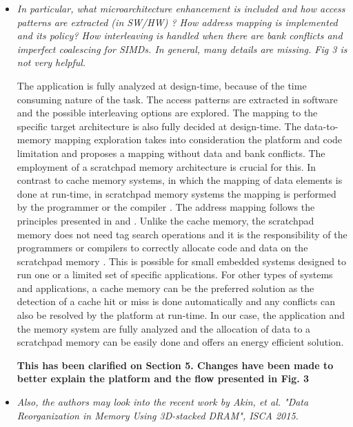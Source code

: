 \documentclass[12pt,a4paper,notitlepage]{article}
\begin{document}
\begin{itemize}

\item \textit{In particular, what microarchitecture enhancement is included and how access patterns are extracted (in SW/HW) ?  How address mapping is implemented and its policy?  How interleaving is handled when there are bank conflicts and imperfect coalescing for SIMDs.  In general,  many details are missing.  Fig 3 is not very helpful.}

The application is fully analyzed at design-time, because of the time consuming nature of the task. 
The access patterns are extracted in software and the possible interleaving options are explored. 
The mapping to the specific target architecture is also fully decided at design-time.
The data-to-memory mapping exploration takes into consideration the platform and code limitation and proposes a mapping without data and bank conflicts.
The employment of a scratchpad memory architecture is crucial for this.
In contrast to cache memory systems, in which the mapping of data elements is done at run-time, in scratchpad memory systems the mapping is performed by the programmer or the compiler \cite{ishitobi2007code}. 
The address mapping follows the principles presented in \cite{address} and \cite{sharma2015array}. 
Unlike the cache memory, the scratchpad memory does not need tag search operations and it is the responsibility of the programmers or compilers to correctly allocate code and data on the scratchpad memory \cite{steinke2002assigning}.
This is possible for small embedded systems designed to run one or a limited set of specific applications. 
For other types of systems and applications, a cache memory can be the preferred solution as the detection of a cache hit or miss is done automatically and any conflicts can also be resolved by the platform at run-time.
In our case, the application and the memory system are fully analyzed and the allocation of data to a scratchpad memory can be easily done and offers an energy efficient solution.

\textbf{This has been clarified on Section 5. Changes have been made to better explain the platform and the flow presented in Fig. 3}

\item \textit{Also, the authors may look into the recent work by Akin, et al. "Data Reorganization in Memory Using 3D-stacked DRAM", ISCA 2015.}


\end{itemize}
\end{document}
